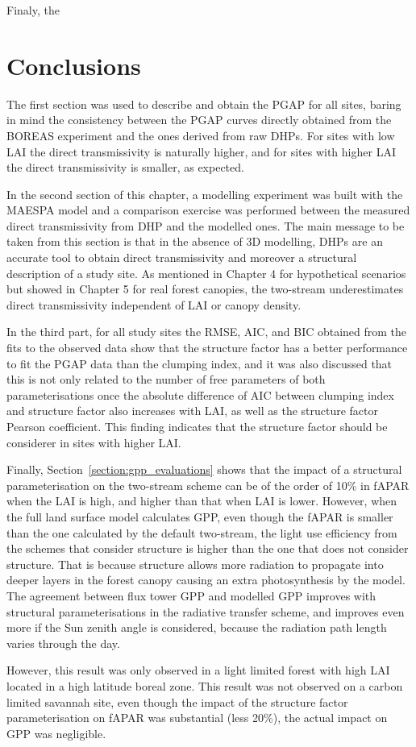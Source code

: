 Finaly, the 





\section{Conclusions}

The first section was used to describe and obtain the PGAP for all sites, baring in mind the consistency between the PGAP curves directly obtained from the BOREAS experiment and the ones derived from raw DHPs. For sites with low LAI the direct transmissivity is naturally higher, and for sites with higher LAI the direct transmissivity is smaller, as expected.

In the second section of this chapter, a modelling experiment was built with the MAESPA model and a comparison exercise was performed between the measured direct transmissivity from DHP and the modelled ones. The main message to be taken from this section is that in the absence of 3D modelling, DHPs are an accurate tool to obtain direct transmissivity and moreover a structural description of a study site. As mentioned in Chapter 4 for hypothetical scenarios but showed in Chapter 5 for real forest canopies, the two-stream underestimates direct transmissivity independent of LAI or canopy density.

In the third part, for all study sites the RMSE, AIC, and BIC obtained from the fits to the observed data show that the structure factor has a better performance to fit the PGAP data than the clumping index, and it was also discussed that this is not only related to the number of free parameters of both parameterisations once the absolute difference of AIC between clumping index and structure factor also increases with LAI, as well as the structure factor Pearson coefficient. This finding indicates that the structure factor should be considerer in sites with higher LAI.

Finally, Section~\ref{section:gpp_evaluations} shows that the impact of a structural parameterisation on the two-stream scheme can be of the order of 10\% in fAPAR when the LAI is high, and higher than that when LAI is lower. However, when the full land surface model calculates GPP, even though the fAPAR is smaller than the one calculated by the default two-stream, the light use efficiency from the schemes that consider structure is higher than the one that does not consider structure. That is because structure allows more radiation to propagate into deeper layers in the forest canopy causing an extra photosynthesis by the model. The agreement between flux tower GPP and modelled GPP improves with structural parameterisations in the radiative transfer scheme, and improves even more if the Sun zenith angle is considered, because the radiation path length varies through the day. 

However, this result was only observed in a light limited forest with high LAI located in a high latitude boreal zone. This result was not observed on a carbon limited savannah site, even though the impact of the structure factor parameterisation on fAPAR was substantial (less 20\%), the actual  impact on GPP was negligible. 
